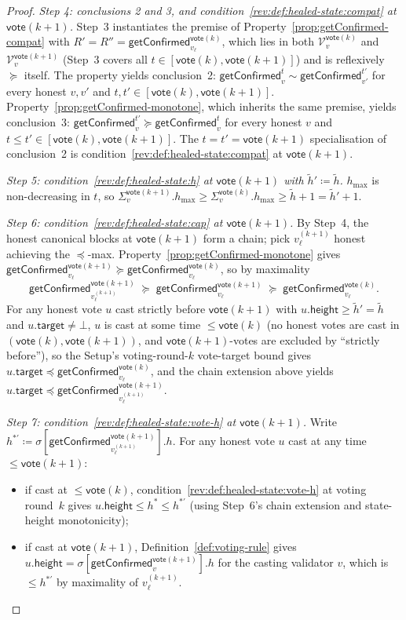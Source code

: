\ifx\litemode\undefined\documentclass{article}\fi
\newcommand{\V}[0]{\ensuremath{\mathcal{V}}}
\newcommand{\target}{\mathsf{target}}
\newcommand{\height}{\mathsf{height}}
\newcommand{\hmax}{\ensuremath{h_{\max}}\xspace}
\newcommand{\vote}{\ensuremath{\mathsf{vote}}}
\newcommand{\comm}[1]{\ensuremath{\widetilde{#1}}}
\newcommand{\getConfirmed}{\textsf{getConfirmed}\xspace}
\theoremstyle{plain}
\theoremstyle{definition}
\theoremstyle{remark}
\begin{document}
\begin{proof}
\medskip

\emph{Step 4: conclusions 2 and 3, and condition~\ref{rev:def:healed-state:compat} at $\vote(k{+}1)$.}
Step~3 instantiates the premise of Property~\ref{prop:getConfirmed-compat} with $R' = R'' = \getConfirmed_{v_\ell}^{\vote(k)}$, which lies in both $\V_v^{\vote(k)}$ and $\V_v^{\vote(k+1)}$ (Step~3 covers all $t \in [\vote(k), \vote(k{+}1)]$) and is reflexively $\succeq$ itself.
The property yields conclusion~2: $\getConfirmed_v^t \sim \getConfirmed_{v'}^{t'}$ for every honest $v, v'$ and $t, t' \in [\vote(k), \vote(k{+}1)]$.
Property~\ref{prop:getConfirmed-monotone}, which inherits the same premise, yields conclusion~3: $\getConfirmed_v^{t'} \succeq \getConfirmed_v^t$ for every honest $v$ and $t \leq t' \in [\vote(k), \vote(k{+}1)]$.
The $t = t' = \vote(k{+}1)$ specialisation of conclusion~2 is condition~\ref{rev:def:healed-state:compat} at $\vote(k{+}1)$.

\emph{Step 5: condition~\ref{rev:def:healed-state:h} at $\vote(k{+}1)$ with $\comm{h}' \coloneqq \comm{h}$.}
$\hmax$ is non-decreasing in $t$, so $\Sigma_v^{\vote(k+1)}.\hmax \geq \Sigma_v^{\vote(k)}.\hmax \geq \comm{h} + 1 = \comm{h}' + 1$.

\emph{Step 6: condition~\ref{rev:def:healed-state:cap} at $\vote(k{+}1)$.}
By Step~4, the honest canonical blocks at $\vote(k{+}1)$ form a chain; pick $v_\ell^{(k+1)}$ honest achieving the $\preceq$-max.
Property~\ref{prop:getConfirmed-monotone} gives $\getConfirmed_{v_\ell}^{\vote(k+1)} \succeq \getConfirmed_{v_\ell}^{\vote(k)}$, so by maximality
\[
  \getConfirmed_{v_\ell^{(k+1)}}^{\vote(k+1)} \;\succeq\; \getConfirmed_{v_\ell}^{\vote(k+1)} \;\succeq\; \getConfirmed_{v_\ell}^{\vote(k)}.
\]
For any honest vote $u$ cast strictly before $\vote(k{+}1)$ with $u.\height \geq \comm{h}' = \comm{h}$ and $u.\target \neq \bot$, $u$ is cast at some time $\leq \vote(k)$ (no honest votes are cast in $(\vote(k), \vote(k{+}1))$, and $\vote(k{+}1)$-votes are excluded by ``strictly before''), so the Setup's voting-round-$k$ vote-target bound gives $u.\target \preceq \getConfirmed_{v_\ell}^{\vote(k)}$, and the chain extension above yields $u.\target \preceq \getConfirmed_{v_\ell^{(k+1)}}^{\vote(k+1)}$.

\emph{Step 7: condition~\ref{rev:def:healed-state:vote-h} at $\vote(k{+}1)$.}
Write $h^{\ast\prime} \coloneqq \sigma[\getConfirmed_{v_\ell^{(k+1)}}^{\vote(k+1)}].h$.
For any honest vote $u$ cast at any time $\leq \vote(k{+}1)$:
\begin{itemize}
  \item if cast at $\leq \vote(k)$, condition~\ref{rev:def:healed-state:vote-h} at voting round~$k$ gives $u.\height \leq h^\ast \leq h^{\ast\prime}$ (using Step~6's chain extension and state-height monotonicity);
  \item if cast at $\vote(k{+}1)$, Definition~\ref{def:voting-rule} gives $u.\height = \sigma[\getConfirmed_{v}^{\vote(k+1)}].h$ for the casting validator $v$, which is $\leq h^{\ast\prime}$ by maximality of $v_\ell^{(k+1)}$.
\end{itemize}


\end{proof}
\end{document}
